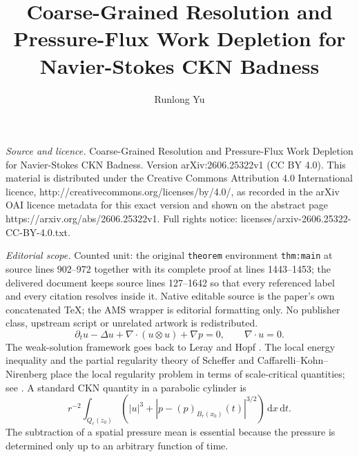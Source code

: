 \documentclass[10pt,a4paper]{amsart}
\numberwithin{equation}{section}
\newcommand{\dxdt}{\,\mathrm dx\,\mathrm dt}
\begin{document}
\title[Coarse-Grained Resolution and Pressure-Flux Work Depletion f]{Coarse-Grained Resolution and Pressure-Flux Work Depletion for Navier-Stokes CKN Badness}
\author{Runlong Yu}
\date{}
\maketitle
\noindent\emph{Source and licence.} Coarse-Grained Resolution and Pressure-Flux Work Depletion for Navier-Stokes CKN Badness. Version arXiv:2606.25322v1 (CC BY 4.0). This material is distributed under the Creative Commons Attribution 4.0 International licence, http://creativecommons.org/licenses/by/4.0/, as recorded in the arXiv OAI licence metadata for this exact version and shown on the abstract page https://arxiv.org/abs/2606.25322v1. Full rights notice: licenses/arxiv-2606.25322-CC-BY-4.0.txt.\par\smallskip
\noindent\textit{Editorial scope.} Counted unit: the original \texttt{theorem} environment \texttt{thm:main} at source lines 902--972 together with its complete proof at lines 1443--1453; the delivered document keeps source lines 127--1642 so that every referenced label and every citation resolves inside it. Native editable source is the paper's own concatenated TeX; the AMS wrapper is editorial formatting only. No publisher class, upstream script or unrelated artwork is redistributed.
\begin{equation}\label{eq:NS}
\partial_t u-\Delta u+\nabla\cdot(u\otimes u)+\nabla p=0,
\qquad \nabla\cdot u=0.
\end{equation}
The weak-solution framework goes back to Leray and Hopf \cite{Leray1934,Hopf1951}.  The local energy inequality and the partial regularity theory of Scheffer and Caffarelli--Kohn--Nirenberg place the local regularity problem in terms of scale-critical quantities; see \cite{Scheffer1976,CKN1982,Lin1998,Vasseur2007,LemarieRieusset2002,LemarieRieusset2016,Seregin2015}.  A standard CKN quantity in a parabolic cylinder is
\begin{equation}\label{eq:CKN-intro}
r^{-2}\int_{Q_r(z_0)}\left(|u|^3+|p-(p)_{B_r(x_0)}(t)|^{3/2}\right)\dxdt.
\end{equation}
The subtraction of a spatial pressure mean is essential because the pressure is determined only up to an arbitrary function of time.
\end{document}
